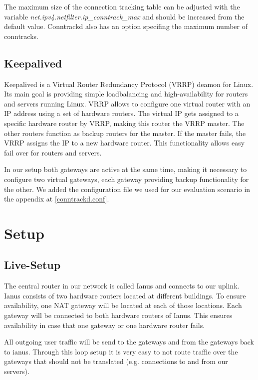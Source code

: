 \documentclass{report}
\begin{document}
The maximum size of the connection tracking table can be adjusted with
the variable \linebreak \textit{net.ipv4.netfilter.ip\_conntrack\_max} and should be
increased from the default value. Conntrackd also has an option specifing
the maximum number of conntracks.

\section{Keepalived}\label{keepalived}

Keepalived\cite{keepalived} is a Virtual Router Redundancy Protocol (VRRP)\cite{vrrp} deamon
for Linux. Its main goal is providing simple loadbalancing and
high-availability for routers and servers running Linux. VRRP allows to
configure one virtual router with an IP address using a set of hardware
routers. The virtual IP gets assigned to a specific hardware router by
VRRP, making this router the VRRP master. The other routers
function as backup routers for the master. If the master fails, the VRRP
assigns the IP to a new hardware router. This functionality allows easy
fail over for routers and servers.

In our setup both gateways are active at the same time, making it
necessary to configure two virtual gateways, each gateway
providing backup functionality for the other. We added the configuration file
we used for our evaluation scenario in the appendix at \ref{conntrackd.conf}.


\chapter{Setup}\label{setup}

\section{Live-Setup}\label{live-setup}

The central router in our network is called Ianus and connects to
our uplink. Ianus consists of two hardware routers located at different
buildings. To ensure availability, one NAT gateway will be located at
each of those locations. Each gateway will be connected to both hardware
routers of Ianus. This ensures availability in case that one gateway or
one hardware router fails.

All outgoing user traffic will be send to the gateways and from the
gateways back to ianus. Through this loop setup it is very easy to not
route traffic over the gateways that should not be translated (e.g.
connections to and from our servers).
\end{document}
